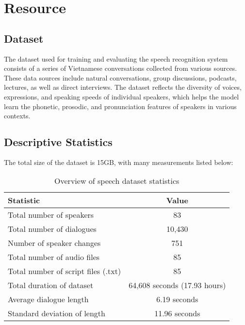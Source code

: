 \documentclass[conference]{IEEEtran}
\begin{document}
\section{Resource}
\subsection{Dataset}
The dataset used for training and evaluating the speech recognition system consists of a series of Vietnamese conversations collected from various sources. These data sources include natural conversations, group discussions, podcasts, lectures, as well as direct interviews. The dataset reflects the diversity of voices, expressions, and speaking speeds of individual speakers, which helps the model learn the phonetic, prosodic, and pronunciation features of speakers in various contexts.

\subsection{Descriptive Statistics}
The total size of the dataset is 15GB, with many measurements listed below:
\begin{table}[h]
    \centering
    \caption{Overview of speech dataset statistics}
    \begin{tabular}{|l|c|}
        \hline
        \textbf{Statistic}                  & \textbf{Value}               \\
        \hline
        Total number of speakers            & 83                           \\
        Total number of dialogues           & 10,430                       \\
        Number of speaker changes           & 751                          \\
        Total number of audio files         & 85                           \\
        Total number of script files (.txt) & 85                           \\
        Total duration of dataset           & 64,608 seconds (17.93 hours) \\
        Average dialogue length             & 6.19 seconds                 \\
        Standard deviation of length        & 11.96 seconds                \\
        \hline
    \end{tabular}
\end{table}
\end{document}
